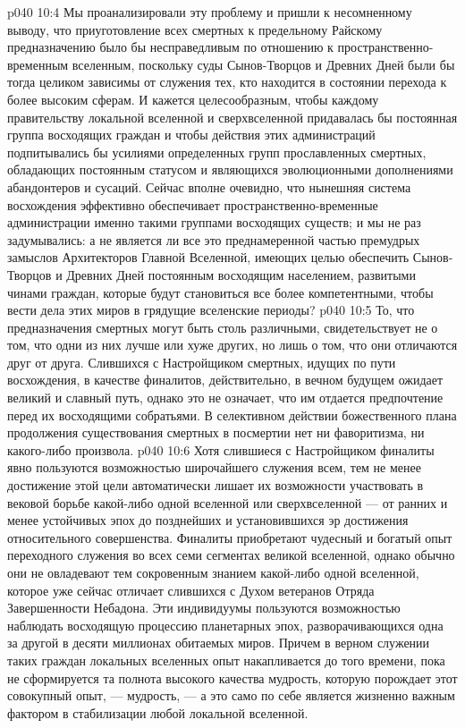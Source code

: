 \vs p040 10:4 Мы проанализировали эту проблему и пришли к несомненному выводу, что приуготовление всех смертных к предельному Райскому предназначению было бы несправедливым по отношению к пространственно\hyp{}временным вселенным, поскольку суды Сынов\hyp{}Творцов и Древних Дней были бы тогда целиком зависимы от служения тех, кто находится в состоянии перехода к более высоким сферам. И кажется целесообразным, чтобы каждому правительству локальной вселенной и сверхвселенной придавалась бы постоянная группа восходящих граждан и чтобы действия этих администраций подпитывались бы усилиями определенных групп прославленных смертных, обладающих постоянным статусом и являющихся эволюционными дополнениями абандонтеров и сусаций. Сейчас вполне очевидно, что нынешняя система восхождения эффективно обеспечивает пространственно\hyp{}временные администрации именно такими группами восходящих существ; и мы не раз задумывались: а не является ли все это преднамеренной частью премудрых замыслов Архитекторов Главной Вселенной, имеющих целью обеспечить Сынов\hyp{}Творцов и Древних Дней постоянным восходящим населением, развитыми чинами граждан, которые будут становиться все более компетентными, чтобы вести дела этих миров в грядущие вселенские периоды?
\vs p040 10:5 \pc То, что предназначения смертных могут быть столь различными, свидетельствует не о том, что одни из них лучше или хуже других, но лишь о том, что они отличаются друг от друга. Слившихся с Настройщиком смертных, идущих по пути восхождения, в качестве финалитов, действительно, в вечном будущем ожидает великий и славный путь, однако это не означает, что им отдается предпочтение перед их восходящими собратьями. В селективном действии божественного плана продолжения существования смертных в посмертии нет ни фаворитизма, ни какого\hyp{}либо произвола.
\vs p040 10:6 \pc Хотя слившиеся с Настройщиком финалиты явно пользуются возможностью широчайшего служения всем, тем не менее достижение этой цели автоматически лишает их возможности участвовать в вековой борьбе какой\hyp{}либо одной вселенной или сверхвселенной --- от ранних и менее устойчивых эпох до позднейших и установившихся эр достижения относительного совершенства. Финалиты приобретают чудесный и богатый опыт переходного служения во всех семи сегментах великой вселенной, однако обычно они не овладевают тем сокровенным знанием какой\hyp{}либо одной вселенной, которое уже сейчас отличает слившихся с Духом ветеранов Отряда Завершенности Небадона. Эти индивидуумы пользуются возможностью наблюдать восходящую процессию планетарных эпох, разворачивающихся одна за другой в десяти миллионах обитаемых миров. Причем в верном служении таких граждан локальных вселенных опыт накапливается до того времени, пока не сформируется та полнота высокого качества мудрость, которую порождает этот совокупный опыт, ---  мудрость, --- а это само по себе является жизненно важным фактором в стабилизации любой локальной вселенной.
